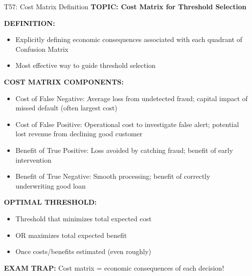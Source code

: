 \documentclass[8pt]{beamer}
\begin{document}
	\begin{frame}{T57: Cost Matrix Definition}
		\fontsize{6.5}{7.5}\selectfont
		\textbf{TOPIC: Cost Matrix for Threshold Selection}
		
		\vspace{0.1cm}
		\textbf{DEFINITION:}
		\begin{itemize}
			\item Explicitly defining economic consequences associated with each quadrant of Confusion Matrix
			\item Most effective way to guide threshold selection
		\end{itemize}
		
		\vspace{0.1cm}
		\textbf{COST MATRIX COMPONENTS:}
		\begin{itemize}
			\item \textcolor{myblue}{Cost of False Negative:} Average loss from undetected fraud; capital impact of missed default (often largest cost)
			\item \textcolor{myblue}{Cost of False Positive:} Operational cost to investigate false alert; potential lost revenue from declining good customer
			\item \textcolor{myblue}{Benefit of True Positive:} Loss avoided by catching fraud; benefit of early intervention
			\item \textcolor{myblue}{Benefit of True Negative:} Smooth processing; benefit of correctly underwriting good loan
		\end{itemize}
		
		\vspace{0.1cm}
		\textbf{OPTIMAL THRESHOLD:}
		\begin{itemize}
			\item Threshold that minimizes total expected cost
			\item OR maximizes total expected benefit
			\item Once costs/benefits estimated (even roughly)
		\end{itemize}
		
		\textcolor{myred}{\textbf{EXAM TRAP:}} Cost matrix = \textcolor{myblue}{economic consequences} of each decision!
	\end{frame}
	
\end{document}
